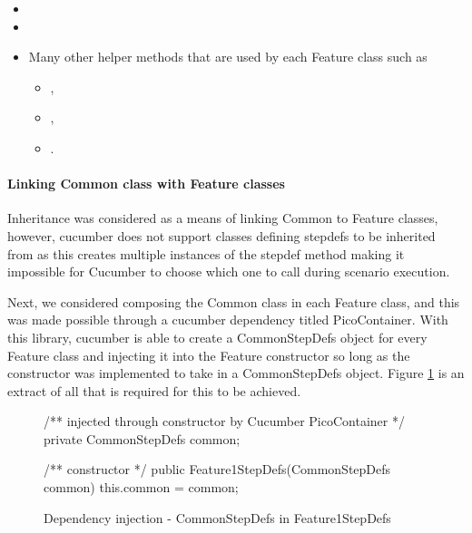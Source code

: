 \begin{itemize}
    \item {}
    \item {}
    \item Many other helper methods that are used by each Feature class such as 
    \begin{itemize}
        \item {}, 
        \item {}, 
        \item {}.
    \end{itemize}
\end{itemize}


\par
\paragraph{Linking Common class with Feature classes\\}
Inheritance was considered as a means of linking Common to Feature classes, however, cucumber does not support classes defining stepdefs to be inherited from as this creates multiple instances of the stepdef method making it impossible for Cucumber to choose which one to call during scenario execution. 
\par 
Next, we considered composing the Common class in each Feature class, and this was made possible through a cucumber dependency titled PicoContainer. With this library, cucumber is able to create a CommonStepDefs object for every Feature class and injecting it into the Feature constructor so long as the constructor was implemented to take in a CommonStepDefs object. Figure \ref{code:cucumber-piccontainer-di} is an extract of all that is required for this to be achieved.

\begin{figure}[H]
\begin{javacode}
/** injected through constructor by Cucumber PicoContainer */
private CommonStepDefs common;

/** constructor */ 
public Feature1StepDefs(CommonStepDefs common) {
    this.common = common;
}
\end{javacode}
\caption{Dependency injection - CommonStepDefs in Feature1StepDefs}    
\label{code:cucumber-piccontainer-di}
\end{figure}
 
